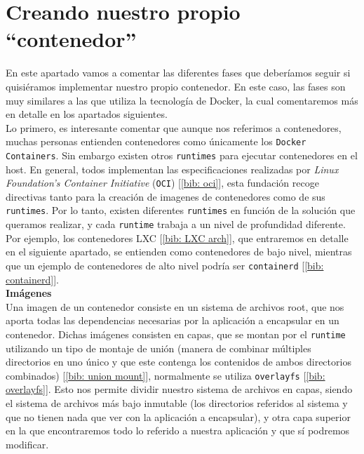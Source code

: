 \documentclass[a4paper, oneside, 12pt]{book}
\begin{document}
	\section{Creando nuestro propio ``contenedor''}
	
	\noindent En este apartado vamos a comentar las diferentes fases que deberíamos seguir si quisiéramos implementar nuestro propio contenedor. En este caso, las fases son muy similares a las que utiliza la tecnología de Docker, la cual comentaremos más en detalle en los apartados siguientes. \\
	
	\noindent Lo primero, es interesante comentar que aunque nos referimos a contenedores, muchas personas entienden contenedores como únicamente los \texttt{Docker Containers}. Sin embargo existen otros \texttt{runtimes} para ejecutar contenedores en el host. En general, todos implementan las especificaciones realizadas por \textit{Linux Foundation's Container Initiative} (\texttt{OCI}) [\ref{bib: oci}], esta fundación recoge directivas tanto para la creación de imagenes de contenedores como de sus \texttt{runtimes}. Por lo tanto, existen diferentes \texttt{runtimes} en función de la solución que queramos realizar, y cada \texttt{runtime} trabaja a un nivel de profundidad diferente. Por ejemplo, los contenedores LXC [\ref{bib: LXC arch}], que entraremos en detalle en el siguiente apartado, se entienden como contenedores de bajo nivel, mientras que un ejemplo de contenedores de alto nivel podría ser \texttt{containerd} [\ref{bib: containerd}]. \\
	
	\noindent \textbf{\large Imágenes}\\
	
	\noindent Una imagen de un contenedor consiste en un sistema de archivos root, que nos aporta todas las dependencias necesarias por la aplicación a encapsular en un contenedor. Dichas imágenes consisten en capas, que se montan por el \texttt{runtime} utilizando un tipo de montaje de unión (manera de combinar múltiples directorios en uno único y que este contenga los contenidos de ambos directorios combinados) [\ref{bib: union mount}], normalmente se utiliza \texttt{overlayfs} [\ref{bib: overlayfs}]. Esto nos permite dividir nuestro sistema de archivos en capas, siendo el sistema de archivos más bajo inmutable (los directorios referidos al sistema y que no tienen nada que ver con la aplicación a encapsular), y otra capa superior en la que encontraremos todo lo referido a nuestra aplicación y que sí podremos modificar. \\
	
\end{document}
